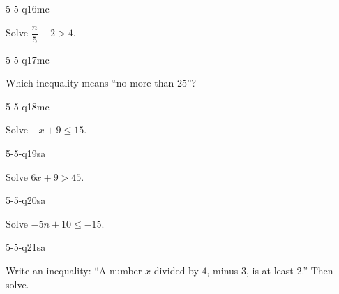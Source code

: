 \begin{practiceQuestion}{5-5-q16}{mc}
\begin{questionText}
Solve $\dfrac{n}{5} - 2 > 4$.
\end{questionText}
\end{practiceQuestion}

\begin{practiceQuestion}{5-5-q17}{mc}
\begin{questionText}
Which inequality means ``no more than $25$''?
\end{questionText}
\end{practiceQuestion}

\begin{practiceQuestion}{5-5-q18}{mc}
\begin{questionText}
Solve $-x + 9 \leq 15$.
\end{questionText}
\end{practiceQuestion}


\begin{practiceQuestion}{5-5-q19}{sa}
\begin{questionText}
Solve $6x + 9 > 45$.
\end{questionText}
\end{practiceQuestion}

\begin{practiceQuestion}{5-5-q20}{sa}
\begin{questionText}
Solve $-5n + 10 \leq -15$.
\end{questionText}
\end{practiceQuestion}

\begin{practiceQuestion}{5-5-q21}{sa}
\begin{questionText}
Write an inequality: ``A number $x$ divided by $4$, minus $3$, is at least $2$.'' Then solve.
\end{questionText}
\end{practiceQuestion}

